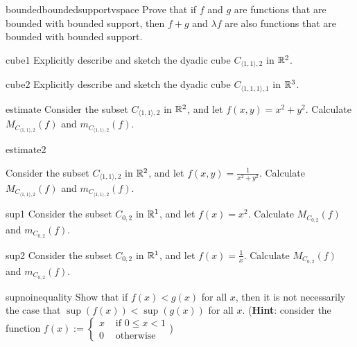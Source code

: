 \begin{problem}{boundedboundedsupportvspace}
    Prove that if $f$ and $g$ are functions that are bounded with bounded support, then $f+g$ and $\lambda f$ are also functions that are bounded with bounded support.
\end{problem}

\begin{problem}{cube1}
    Explicitly describe and sketch the dyadic cube $C_{\langle1,1\rangle,2}$ in $\mathbb{R}^2$.
\end{problem}

\begin{problem}{cube2}
    Explicitly describe and sketch the dyadic cube $C_{\langle1,1,1\rangle,1}$ in $\mathbb{R}^3$.
\end{problem}

\begin{problem}{estimate}
    Consider the subset $C_{\langle1,1\rangle,2}$ in $\mathbb{R}^2$, and let $f(x,y) = x^2 + y^2$.  Calculate $M_{C_{\langle1,1\rangle,2}}(f)$ and $m_{C_{\langle1,1\rangle,2}}(f)$.
\end{problem}

\begin{problem}{estimate2}

Consider the subset $C_{\langle1,1\rangle,2}$ in $\mathbb{R}^2$, and let $f(x,y) = \frac{1}{x^2 + y^2}$.  Calculate $M_{C_{\langle1,1\rangle,2}}(f)$ and $m_{C_{\langle1,1\rangle,2}}(f)$.
    
\end{problem}


\begin{problem}{sup1}
     Consider the subset $C_{0,2}$ in $\mathbb{R}^1$, and let $f(x) = x^2$.  Calculate $M_{C_{0,2}}(f)$ and $m_{C_{0,2}}(f)$.
\end{problem}

\begin{problem}{sup2}
     Consider the subset $C_{0,2}$ in $\mathbb{R}^1$, and let $f(x) = \frac{1}{x}$.  Calculate $M_{C_{0,2}}(f)$ and $m_{C_{0,2}}(f)$.
\end{problem}

\begin{problem}{supnoinequality}
    Show that if $f(x) < g(x)$ for all $x$, then it is not necessarily the case that $\sup(f(x)) < \sup(g(x))$ for all $x$. (\textbf{Hint}: consider the function $f(x) := \left\{
		\begin{array}{ll}
			x & \text{ if } 0 \leq x < 1 \\
			0 & \text{ otherwise}
		\end{array}
		\right.$)
\end{problem}

